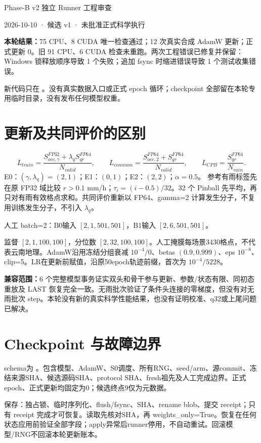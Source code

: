 \documentclass[UTF8,11pt,a4paper]{ctexart}
\begin{document}
\begin{center}{\Large Phase-B v2 独立 Runner 工程审查}\par
{\small 2026-10-10 · 候选 v1 · 未批准正式科学执行}\end{center}
\textbf{本轮结果：}75 CPU、8 CUDA 唯一检查通过；12 次真实合成 AdamW 更新；正式更新 0。旧 91 CPU、6 CUDA 检查未重跑。两次工程错误已修复并保留：Windows 锁释放顺序导致 1 个失败；追加 fsync 时缩进错误导致 1 个测试收集错误。

新代码只在 。没有真实数据入口或正式 epoch 循环；checkpoint 全部留在本轮专用临时目录，没有发布任何模型权重。
\section*{更新及共同评价的区别}
\[
L_{train}=\frac{S_{occ,\gamma}^{FP32}+\lambda_qS_{qr}^{FP64}}{N_{valid}},\qquad
L_{common}=\frac{S_{occ,2}^{FP64}+S_{qr}^{FP64}}{N_{valid}},\qquad
L_{CPB}=\frac{S_{qr}^{FP64}}{N_{rain}}.
\]
E0：$(\gamma,\lambda_q)=(2,1)$；E1：$(0,1)$；E2：$(2,2)$；$\alpha=0.5$。
参考有雨标签先在原 FP32 域比较 $r>0.1$ mm/h；$\tau_i=(i-0.5)/32$。32 个 Pinball 先平均，再只对有雨有效格点求和。共同评价重新以 FP64、gamma=2 计算发生分子，不复用训练发生分子，不引入 $\lambda_q$。

人工 batch=2：B0输入 $[2,1,501,501]$，B1输入 $[2,6,501,501]$。\par 监督 $[2,1,100,100]$，分位数 $[2,32,100,100]$。人工掩膜每场景3430格点，不代表云南地理。AdamW沿用冻结分组衰减 $10^{-4}/0$、betas $(0.9,0.999)$、eps $10^{-8}$、clip=5。LR在更新前赋值，沿原50epoch轨迹前缀，首次为 $10^{-4}/5228$。

\textbf{兼容范围：}6 个完整模型事务证实双头和骨干参与更新、参数/状态有限、同初态重放及 LAST 恢复完全一致。无雨批次验证了条件头连接的零梯度，但没有对无雨批次 step。本轮没有新的真实科学性能结果，也没有证明校准、q32或上尾问题已解决。
\newpage
\section*{Checkpoint 与故障边界}
schema为 。包含模型、AdamW、S0调度、所有RNG、seed/arm、源commit、冻结来源SHA、候选源码SHA、protocol SHA、fresh祖先及人工完成边界。正式epoch、正式更新均固定为0；候选终点9仅为元数据。

保存：独占锁、临时序列化、flush/fsync、SHA、rename blob、提交 receipt；只有 receipt 完成才可恢复。读取先核对SHA，再 weights\_only=True。恢复在任何状态应用前验证全部字段；apply异常后runner停用，不自动重试。回滚模型/RNG不回滚本轮更新账本。
\end{document}
